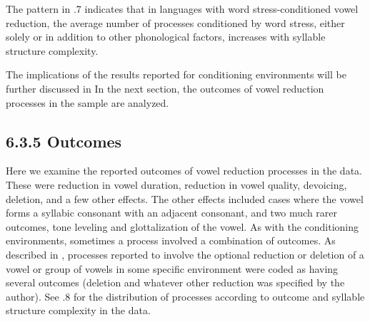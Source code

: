   The pattern in .7 indicates that in languages with word stress-conditioned vowel reduction, the average number of processes conditioned by word stress, either solely or in addition to other phonological factors, increases with syllable structure complexity.

  The implications of the results reported for conditioning environments will be further discussed in  In the next section, the outcomes of vowel reduction processes in the sample are analyzed.

\subsection{6.3.5 Outcomes}

  Here we examine the reported outcomes of vowel reduction processes in the data. These were reduction in vowel duration, reduction in vowel quality, devoicing, deletion, and a few other effects. The other effects included cases where the vowel forms a syllabic consonant with an adjacent consonant, and two much rarer outcomes, tone leveling and glottalization of the vowel. As with the conditioning environments, sometimes a process involved a combination of outcomes. As described in , processes reported to involve the optional reduction or deletion of a vowel or group of vowels in some specific environment were coded as having several outcomes (deletion and whatever other reduction was specified by the author). See .8 for the distribution of processes according to outcome and syllable structure complexity in the data.

